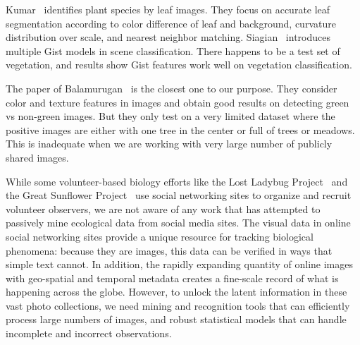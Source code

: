 Kumar\etal~\cite{kumar2012leafsnap} identifies plant species by leaf images. They focus on accurate leaf segmentation according to color difference of leaf and background, curvature distribution over scale, and nearest neighbor matching. Siagian\etal~\cite{siagian2008comparison} introduces multiple Gist models in scene classification. There happens to be a test set of vegetation, and results show Gist features work well on vegetation classification. %


The paper of Balamurugan\etal~\cite{balamurugan2007greenery}
is the closest one to our purpose. They consider color and texture features in images and obtain good results on detecting green vs non-green images. But they only test on a very limited dataset where the positive images are either with one tree in the center or full of trees or meadows. This is inadequate when we are working with very large number of publicly shared images.


While some volunteer-based biology efforts like the Lost Ladybug
Project~\cite{lostladybug} and the Great Sunflower
Project~\cite{greatsunflower} use social networking sites to
organize and recruit volunteer observers, we are not aware of any
work that has attempted to passively mine ecological data from social media
sites. The visual data in online social networking sites provide a
unique resource for tracking biological phenomena:  because they are
images, this data can be verified in ways that simple text 
cannot.  In addition, the rapidly expanding quantity
of online images with geo-spatial and temporal metadata creates a
fine-scale record of what is happening across the globe.  However, to
unlock the latent information in these vast photo collections, we need
mining and recognition tools that can efficiently
process large numbers of images, and robust statistical models that
can handle incomplete and incorrect observations.




